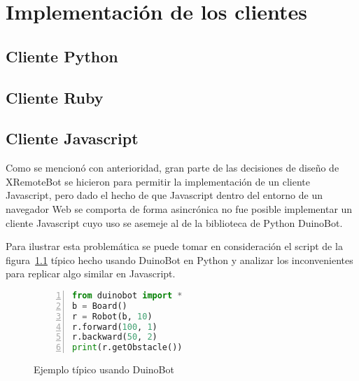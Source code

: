 
\chapter{Implementación de los clientes}\label{ch4}

\section{Cliente Python}\label{ch4:python}
\section{Cliente Ruby}\label{ch4:ruby}
\section{Cliente Javascript}\label{ch4:javascript}

Como se mencionó con anterioridad, gran parte de las decisiones de diseño de XRemoteBot
se hicieron para permitir la implementación de un cliente Javascript, pero dado el hecho
de que Javascript dentro del entorno de un navegador Web se comporta de forma asincrónica
no fue posible implementar un cliente Javascript cuyo uso se asemeje al de la biblioteca
de Python DuinoBot.

Para ilustrar esta problemática se puede tomar en consideración el script de la
figura~\ref{lst:duinobot_ejemplo}
típico hecho usando DuinoBot en Python y analizar los inconvenientes para replicar
algo similar en Javascript.

\begin{figure}
    \begin{lstlisting}[language=Python,numbers=left]
from duinobot import *
b = Board()
r = Robot(b, 10)
r.forward(100, 1)
r.backward(50, 2)
print(r.getObstacle())
    \end{lstlisting}
    \caption{Ejemplo típico usando DuinoBot}
    \label{lst:duinobot_ejemplo}
\end{figure}
